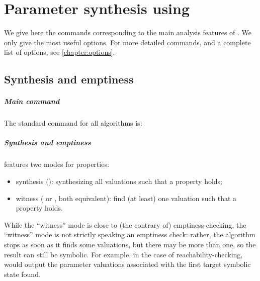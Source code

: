 \chapter{Parameter synthesis using \imitator{}}


We give here the commands corresponding to the main analysis features of \imitator{}.
We only give the most useful options.
For more detailed commands, and a complete list of options, see \cref{chapter:options}.

\section{Synthesis and emptiness}

\paragraph{Main command}
The standard \imitator{} command for all algorithms is:


\paragraph{Synthesis and emptiness}
\imitator{} features two modes for properties:

\begin{itemize}
	\item synthesis (): synthesizing all valuations such that a property holds;
	\item witness ( or , both equivalent): find (at least) one valuation such that a property holds.
\end{itemize}

While the ``witness'' mode is close to (the contrary of) emptiness-checking, the ``witness'' mode is not strictly speaking an emptiness check: rather, the algorithm stops as soon as it finds some valuations, but there may be more than one, so the result can still be symbolic.
For example, in the case of reachability-checking, \imitator{} would output the parameter valuations associated with the first target symbolic state found.


